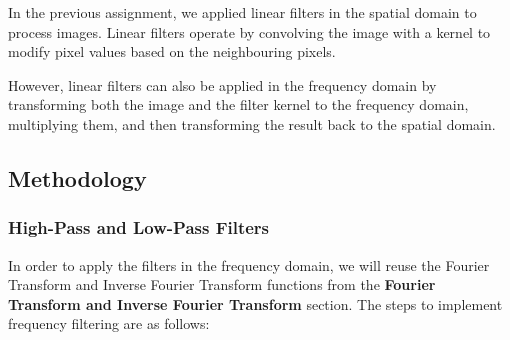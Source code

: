 \documentclass[a4paper,12pt]{article}
\begin{document}
In the previous assignment, we applied linear filters in the spatial domain to process images. Linear filters operate by convolving the image with a kernel to modify pixel values based on the neighbouring pixels.

However, linear filters can also be applied in the frequency domain by transforming both the image and the filter kernel to the frequency domain, multiplying them, and then transforming the result back to the spatial domain.

\subsection{Methodology}

\subsubsection{High-Pass and Low-Pass Filters}

In order to apply the filters in the frequency domain, we will reuse the Fourier Transform and Inverse Fourier Transform functions from the \textbf{Fourier Transform and Inverse Fourier Transform} section. The steps to implement frequency filtering are as follows:
\end{document}
